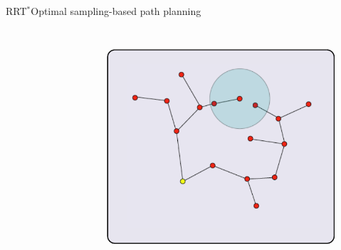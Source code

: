 \begin{frame}{RRT$^{*}$}{Optimal sampling-based path planning}
\begin{columns}
\begin{figure}
		\label{fig:rrts:04}
	\end{figure}
	\begin{figure}
		\centering
		\includegraphics[width=\linewidth]{figure/RRTs05.png}
		\label{fig:rrts:05}
	\end{figure}
\end{columns}
\end{frame}

